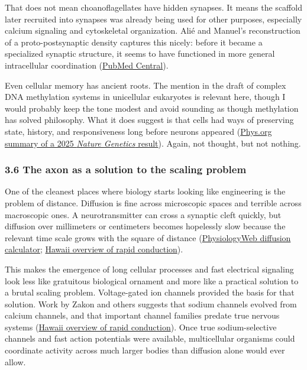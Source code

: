 That does not mean choanoflagellates have hidden synapses. It means the scaffold later recruited into synapses was already being used for other purposes, especially calcium signaling and cytoskeletal organization. Alié and Manuel's reconstruction of a proto-postsynaptic density captures this nicely: before it became a specialized synaptic structure, it seems to have functioned in more general intracellular coordination (\href{https://pmc.ncbi.nlm.nih.gov/articles/PMC2824662/}{PubMed Central}).

Even cellular memory has ancient roots. The mention in the draft of complex DNA methylation systems in unicellular eukaryotes is relevant here, though I would probably keep the tone modest and avoid sounding as though methylation has solved philosophy. What it does suggest is that cells had ways of preserving state, history, and responsiveness long before neurons appeared (\href{https://phys.org/news/2025-11-celled-complex-dna-epigenetic-code.html}{Phys.org summary of a 2025 \emph{Nature Genetics} result}). Again, not thought, but not nothing.

\subsubsection{3.6 The axon as a solution to the scaling problem}\label{03_it_started-the-axon-as-a-solution-to-the-scaling-problem}

One of the cleanest places where biology starts looking like engineering is the problem of distance. Diffusion is fine across microscopic spaces and terrible across macroscopic ones. A neurotransmitter can cross a synaptic cleft quickly, but diffusion over millimeters or centimeters becomes hopelessly slow because the relevant time scale grows with the square of distance (\href{https://www.physiologyweb.com/calculators/diffusion_time_calculator.html}{PhysiologyWeb diffusion calculator}; \href{https://www1.pbrc.hawaii.edu/~danh/MyelinEvolution/rapid-conduction.html}{Hawaii overview of rapid conduction}).

This makes the emergence of long cellular processes and fast electrical signaling look less like gratuitous biological ornament and more like a practical solution to a brutal scaling problem. Voltage-gated ion channels provided the basis for that solution. Work by Zakon and others suggests that sodium channels evolved from calcium channels, and that important channel families predate true nervous systems (\href{https://www1.pbrc.hawaii.edu/~danh/MyelinEvolution/rapid-conduction.html}{Hawaii overview of rapid conduction}). Once true sodium-selective channels and fast action potentials were available, multicellular organisms could coordinate activity across much larger bodies than diffusion alone would ever allow.


